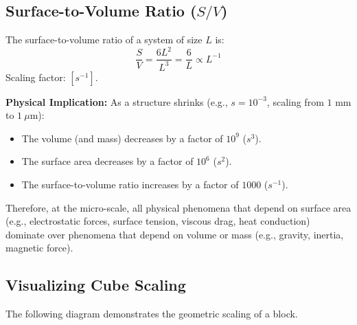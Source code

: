\documentclass[12pt,a4paper]{article}
\begin{document}
\subsection{Surface-to-Volume Ratio \texorpdfstring{($S/V$)}{S/V}}
The surface-to-volume ratio of a system of size $L$ is:
$$\frac{S}{V} = \frac{6L^2}{L^3} = \frac{6}{L} \propto L^{-1}$$
Scaling factor: $[s^{-1}]$.

\textbf{Physical Implication:}
As a structure shrinks (e.g., $s = 10^{-3}$, scaling from $1\text{ mm}$ to $1\ \mu\text{m}$):
\begin{itemize}[leftmargin=*, itemsep=2.5pt]
  \item The volume (and mass) decreases by a factor of $10^9$ ($s^3$).
  \item The surface area decreases by a factor of $10^6$ ($s^2$).
  \item The surface-to-volume ratio increases by a factor of $1000$ ($s^{-1}$).
\end{itemize}
Therefore, at the micro-scale, all physical phenomena that depend on surface area (e.g., electrostatic forces, surface tension, viscous drag, heat conduction) dominate over phenomena that depend on volume or mass (e.g., gravity, inertia, magnetic force).

\subsection{Visualizing Cube Scaling}
The following diagram demonstrates the geometric scaling of a block.
\end{document}
